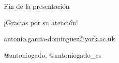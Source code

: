 \documentclass[xcolor=svgnames]{beamer}
\begin{document}
\begin{frame}{Fin de la presentación}
  \begin{center}
    {\Huge ¡Gracias por su atención!}

    \vspace{3em}

    {\Large
      \href{mailto:antonio.garcia-dominguez@york.ac.uk}{antonio.garcia-dominguez@york.ac.uk}}

    \vspace{1em}

    {\Large @antoniogado, @antoniogado\_es}
  \end{center}
\end{frame}
\end{document}
